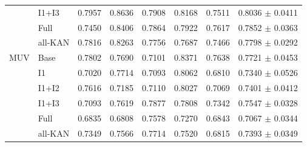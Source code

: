 \begin{landscape}
\begin{longtable}{llrrrrrr}
 & I1+I3 & 0.7957 & 0.8636 & 0.7908 & 0.8168 & 0.7511 & 0.8036 $\pm$ 0.0411 \\
 & Full & 0.7450 & 0.8406 & 0.7864 & 0.7922 & 0.7617 & 0.7852 $\pm$ 0.0363 \\
 & all-KAN & 0.7816 & 0.8263 & 0.7756 & 0.7687 & 0.7466 & 0.7798 $\pm$ 0.0292 \\
\midrule
MUV & Base & 0.7802 & 0.7690 & 0.7101 & 0.8371 & 0.7638 & 0.7721 $\pm$ 0.0453 \\
 & I1 & 0.7020 & 0.7714 & 0.7093 & 0.8062 & 0.6810 & 0.7340 $\pm$ 0.0526 \\
 & I1+I2 & 0.7616 & 0.7185 & 0.7110 & 0.8027 & 0.7069 & 0.7401 $\pm$ 0.0412 \\
 & I1+I3 & 0.7093 & 0.7619 & 0.7877 & 0.7808 & 0.7342 & 0.7547 $\pm$ 0.0328 \\
 & Full & 0.6835 & 0.6808 & 0.7578 & 0.7270 & 0.6843 & 0.7067 $\pm$ 0.0344 \\
 & all-KAN & 0.7349 & 0.7566 & 0.7714 & 0.7520 & 0.6815 & 0.7393 $\pm$ 0.0349 \\
\bottomrule
\end{longtable}
\end{landscape}
